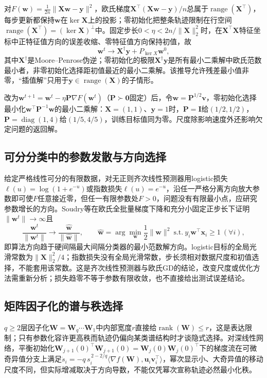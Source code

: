 对$F(\bm w)=\frac1{2n}\|\bm X\bm w-\bm y\|^2$，欧氏梯度$\bm X^\top(\bm X\bm w-\bm y)/n$总属于$\operatorname{range}(\bm X^\top)$，每步更新都保持$\bm w$在$\ker\bm X$上的投影；零初始化把整条轨迹限制在行空间$\operatorname{range}(\bm X^\top)=(\ker\bm X)^\perp$中。固定步长$0<\eta<2n/\|\bm X\|_2^2$时，在$\bm X^\top\bm X$特征坐标中正特征值方向的误差收缩、零特征值方向保持初值，故
\[
 \bm w^t\to\bm X^\dagger\bm y+P_{\ker X}\bm w^0,
\]
其中$\bm X^\dagger$是Moore--Penrose伪逆；零初始化的极限$\bm X^\dagger\bm y$是所有最小二乘解中欧氏范数最小者，非零初始化选择距初值最近的最小二乘解。该推导允许残差最小值非零，“插值解”只用于$\bm y\in\operatorname{range}(\bm X)$的子情形。

改为$\bm w^{t+1}=\bm w^t-\eta\bm P\nabla F(\bm w^t)$（$\bm P\succ\bm0$固定）后，令$\bm w=\bm P^{1/2}\bm v$，零初始化选择最小化$\bm w^\top\bm P^{-1}\bm w$的最小二乘解：$\bm X=(1,1)$、$\bm y=1$时，$\bm P=\bm I$给$(1/2,1/2)$，$\bm P=\operatorname{diag}(1,4)$给$(1/5,4/5)$，训练目标值同为零。尺度除影响速度外还影响欠定问题的返回解。

\subsection{可分分类中的参数发散与方向选择}

给定严格线性可分的有限数据，对无正则齐次线性预测器用logistic损失$\ell(u)=\log(1+e^{-u})$或指数损失$\ell(u)=e^{-u}$，沿任一严格分离方向放大参数即可使$F$任意接近零，但任一有限参数处$F>0$，问题没有有限最小点，应研究参数增长的方向。Soudry等在欧氏全批量梯度下降和充分小固定正步长下证明$\|\bm w^t\|\to\infty$且
\[
 \frac{\bm w^t}{\|\bm w^t\|}\longrightarrow
 \frac{\widehat{\bm w}}{\|\widehat{\bm w}\|},\qquad
 \widehat{\bm w}=\arg\min_{\bm w}\frac12\|\bm w\|^2
 \ \text{s.t.}\ y_i\bm w^\top\bm x_i\geq1\ (\forall i),
\]
即算法方向趋于硬间隔最大间隔分类器的最小范数解方向。logistic目标的全局光滑常数为$\|\bm X\|_2^2/4$；指数损失没有全局光滑常数，步长须相对数据尺度和初值选择，不能套用该常数。这是齐次线性预测器与欧氏GD的结论，改变尺度或优化方法需重新分析；损失趋零不等于参数有限收敛，也不直接给出测试误差结论。

\subsection{矩阵因子化的谱与秩选择}

$q\geq2$层因子化$\bm W=\bm W_q\cdots\bm W_1$中内部宽度$r$直接给$\operatorname{rank}(\bm W)\leq r$，这是表达限制；只有参数化容许更高秩而轨迹仍偏向某类谱结构时才谈隐式选择。对深线性网络，平衡初始化$\bm W_{j+1}(0)^\top\bm W_{j+1}(0)=\bm W_j(0)\bm W_j(0)^\top$下的梯度流在可微奇异值分支上满足$\dot s_i=-q\,s_i^{\,2-2/q}\langle\nabla f(\bm W),\bm u_i\bm v_i^\top\rangle$，幂次显示小、大奇异值的移动尺度不同，但实际增减取决于方向导数，不能仅凭幂次宣称轨迹必然最小化秩。

